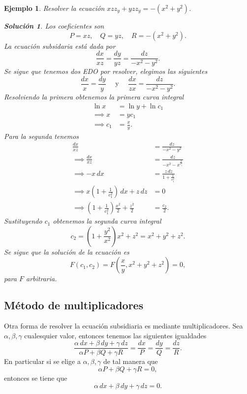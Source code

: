 \documentclass[11pt,letterpaper]{report}
\newtheorem{example}[defn]{Ejemplo}
\newtheorem*{sol}{Solución}
\newcommand\<{\langle}
\renewcommand\>{\rangle}
\begin{document}
\begin{example}
  Resolver la ecuación $xz z_y + yz z_y = -(x^2+y^2)$.
  \begin{sol}
    Los coeficientes son
    \[
    P = xz, \quad Q = yz, \quad R = -(x^2+y^2).
    \] 
    La ecuación subsidaria está dada por
    \[
    \frac{dx}{xz} = \frac{dy}{yz} = \frac{dz}{-x^2-y^2}.
    \] 
    Se sigue que tenemos dos EDO por resolver, elegimos las
    siguientes
    \[
    \frac{dx}{x} = \frac{dy}{y} \quad \text{ y } \quad
    \frac{dx}{zx} = \frac{dz}{-x^2-y^2}.
    \] 
    Resolviendo la primera obtenemos la primera curva
    integral
    \begin{align*}
      \ln x &= \ln y + \ln c_1\\
      \implies x &= yc_1\\
      \implies c_1 &= \frac{x}{y}.
    \end{align*}
    Para la segunda tenemos
    \begin{align*}
      \frac{dx}{xz} &= \frac{dz}{-x^2-y^2}\\
      \implies \frac{dx}{xz} &= \frac{dz}{-x^2-x^\frac{2}{c_1^2}}\\
      \implies -x \, dx &= \frac{z \, dz}{1 + \frac{1}{c_1^2}}\\
      \implies x\left(1+\frac{1}{c_1^2}\right) \, dx + z \, dz &= 0\\
      \implies \left(1+\frac{1}{c_1^2}\right) \frac{x^2}{2} +
      \frac{z^2}{2} &= \frac{c_2}{2}.
    \end{align*}
    Sustituyendo $c_1$ obtenemos la segunda curva integral
    \[
    c_2 = \left(1+\frac{y^2}{x^2}\right) x^2 + z^2 = x^2 +
    y^2 + z^2.
    \] 
    Se sigue que la solución de la ecuación es
    \[
    F(c_1,c_2) = F\left(\frac{x}{y}, x^2+y^2+z^2\right) = 0,
    \] 
    para $F$ arbitraria.
  \end{sol}
\end{example}

\subsection{Método de multiplicadores}

Otra forma de resolver la ecuación subsidiaria es mediante
multiplicadores. Sea $\alpha, \beta, \gamma$ cualesquier
valor, entonces tenemos las siguientes igualdades
\[
\frac{\alpha \, dx + \beta \, dy + \gamma \, dz}{\alpha P +
\beta Q + \gamma R} = \frac{dx}{P} = \frac{dy}{Q} =
\frac{dz}{R}.
\] 
En particular si se elige a $\alpha, \beta, \gamma$ de tal
manera que
\[
\alpha P + \beta Q + \gamma R = 0,
\] 
entonces se tiene que
\[
\alpha \, dx + \beta \, dy + \gamma \, dz = 0.
\] 
\end{document}
